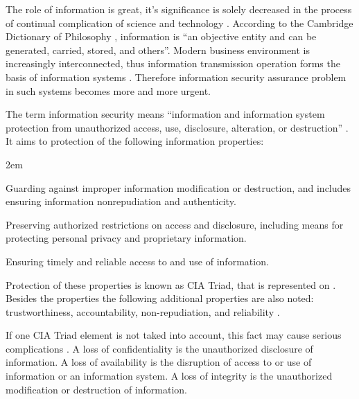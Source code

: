 %
The role of information is great, it's significance is solely decreased in the process of continual complication of science and technology . 
%
According to the Cambridge Dictionary of Philosophy , information is ``an objective entity and can be generated, carried, stored, and others''. 
%
Modern business environment is increasingly interconnected, thus information transmission operation forms the basis of information systems . 
%
Therefore information security assurance problem in such systems becomes more and more urgent. 

%
The term information security means ``information and information system protection from unauthorized access, use, disclosure, alteration, or destruction'' . 
%
It aims to protection of the following information properties:
\begin{description}
	\leftskip2em%
	\setlength{\itemsep}{0pt}%
	\setlength{\parsep}{0pt}%

	\item[Integrity] Guarding against improper information modification or destruction, and includes ensuring information nonrepudiation and authenticity. 
	\item[Confidentiality] Preserving authorized restrictions on access and disclosure, including means for protecting personal privacy and proprietary information. 
	\item[Availability] Ensuring timely and reliable access to and use of information. 
\end{description}

%
Protection of these properties is known as CIA Triad, that is represented on . 
%
Besides the properties the following additional properties are also noted: trustworthiness, accountability, non-repudiation, and reliability . 


%
If one CIA Triad element is not taked into account, this fact may cause serious complications . 
%
A loss of confidentiality is the unauthorized disclosure of information. 
%
A loss of availability is the disruption of access to or use of information or an information system. 
%
A loss of integrity is the unauthorized modification or destruction of information. 

